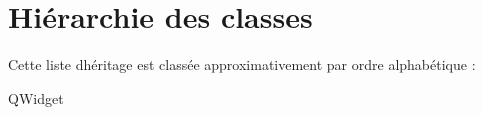 \section{Hiérarchie des classes}
Cette liste d\textquotesingle{}héritage est classée approximativement par ordre alphabétique \+:\begin{DoxyCompactList}
\item Q\+Widget\begin{DoxyCompactList}
\item {}
\end{DoxyCompactList}
\end{DoxyCompactList}
